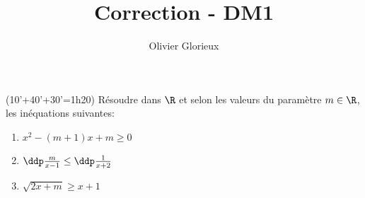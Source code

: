 \documentclass[a4paper, 11pt,reqno]{article}
\author{Olivier Glorieux}
\begin{document}
\title{Correction - DM1 
}





\begin{exercice}(10'+40'+30'=1h20)
R\'esoudre dans $\R$ et selon les valeurs du param\`etre $m\in\R$, les in\'equations suivantes:
\begin{enumerate}
\item $x^2-(m+1)x+m\geq 0$
\item $\ddp\frac{m}{x-1} \leq \ddp\frac{1}{x+2}$
\item $\sqrt{2x+m}\geq x+1$
\end{enumerate}
\end{exercice}
\end{document}
